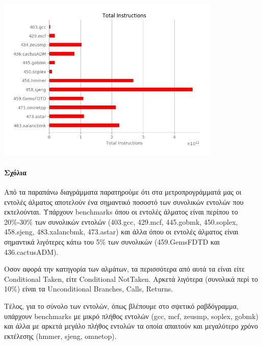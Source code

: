    \begin{minipage}{\textwidth}
      \begin{center}
         \vspace{3mm}
         \includegraphics[width=0.8\textwidth, frame]{./graphs/4-1/total.png}
         \vspace{6mm}
      \end{center}
   \end{minipage}

   \paragraph{Σχόλια}\vspace{1em}

   Από τα παραπάνω διαγράμματα παρατηρούμε ότι στα μετροπρογράμματά μας οι
   εντολές άλματος αποτελούν ένα σημαντικό ποσοστό των συνολικών εντολών που
   εκτελούνται. Υπάρχουν benchmarks όπου οι εντολές άλματος είναι περίπου το
   20\%-30\% των συνολικών εντολών (403.gcc, 429.mcf, 445.gobmk, 450.soplex,
   458.sjeng, 483.xalancbmk, 473.astar) και άλλα όπου οι εντολές άλματος είναι
   σημαντικά λιγότερες κάτω του 5\% των συνολικών (459.GemsFDTD και
   436.cactusADM).
   
   Οσον αφορά την κατηγορία των αλμάτων, τα περισσότερα από αυτά τα είναι είτε
   Conditional Taken, είτε Conditional NotTaken. Αρκετά λιγότερα (συνολικά περί
   το 10\%) είναι τα Unconditional Branches, Calls, Returns.
   
   Τέλος, για το σύνολο των εντολών, όπως βλέπουμε στο σψετικό ραβδόγραμμα,
   υπάρχουν benchmarks με μικρό πλήθος εντολών (gcc, mcf, zeusmp, soplex, gobmk)
   και άλλα με αρκετά μεγάλο πλήθος εντολών τα οποία απαιτούν και μεγαλύτερο
   χρόνο εκτέλεσης (hmmer, sjeng, omnetop).
   